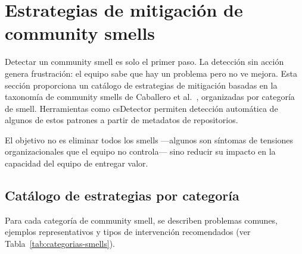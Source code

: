 \section{Estrategias de mitigación de community smells}

Detectar un community smell es solo el primer paso. La detección sin acción genera frustración: el equipo sabe que hay un problema pero no ve mejora. Esta sección proporciona un catálogo de estrategias de mitigación basadas en la taxonomía de community smells de Caballero et al.\ \cite{caballero2022communitysmells}, organizadas por categoría de smell. Herramientas como csDetector \cite{almarimi2021csDetector} permiten detección automática de algunos de estos patrones a partir de metadatos de repositorios.

El objetivo no es eliminar todos los smells ---algunos son síntomas de tensiones organizacionales que el equipo no controla--- sino reducir su impacto en la capacidad del equipo de entregar valor.

\subsection{Catálogo de estrategias por categoría}

Para cada categoría de community smell, se describen problemas comunes, ejemplos representativos y tipos de intervención recomendados (ver Tabla~\ref{tab:categorias-smells}).

